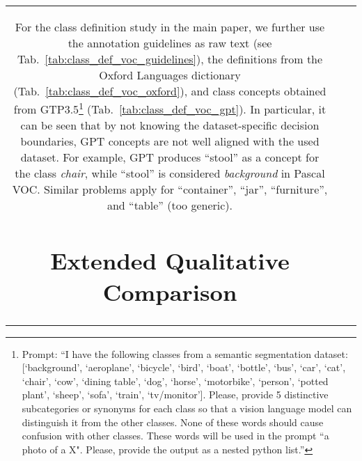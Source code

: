 \documentclass[10pt,twocolumn,letterpaper]{article}
\begin{document}
\begin{figure*}
\begin{tabular}{ccc}
For the class definition study in the main paper, we further use the annotation guidelines as raw text (see Tab.~\ref{tab:class_def_voc_guidelines}), the definitions from the Oxford Languages dictionary (Tab.~\ref{tab:class_def_voc_oxford}), and class concepts obtained from GTP3.5\footnote{Prompt: ``I have the following classes from a semantic segmentation dataset: [`background', `aeroplane', `bicycle', `bird', `boat', `bottle',  `bus', `car', `cat', `chair', `cow', `dining table', `dog',  `horse', `motorbike', `person', `potted plant', `sheep', `sofa',  `train', `tv/monitor']. Please, provide 5 distinctive subcategories or synonyms for each class so that a vision language model can distinguish it from the other classes. None of these words should cause confusion with other classes. These words will be used in the prompt ``a photo of a X". Please, provide the output as a nested python list.''} (Tab.~\ref{tab:class_def_voc_gpt}). In particular, it can be seen that by not knowing the dataset-specific decision boundaries, GPT concepts are not well aligned with the used dataset. For example, GPT produces ``stool'' as a concept for the class \emph{chair}, while ``stool'' is considered \emph{background} in Pascal VOC. Similar problems apply for ``container'', ``jar'', ``furniture'', and ``table'' (too generic).




\section{Extended Qualitative Comparison}
\label{sec:supp_qualitatives}


\end{tabular}
\end{figure*}
\end{document}
